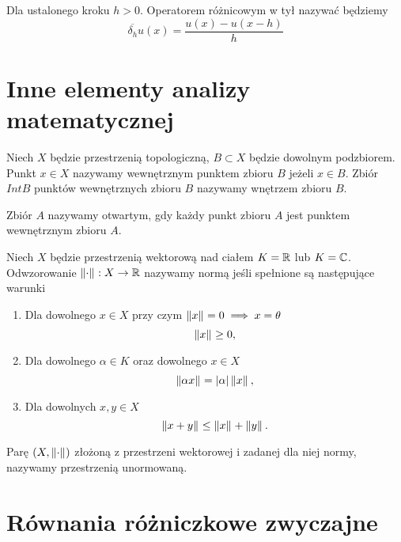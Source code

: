 \documentclass[12pt,a4paper]{report}
\begin{document}
\begin{definition}\label{operator_wtyl}
Dla ustalonego kroku $h>0$. Operatorem różnicowym w tył nazywać będziemy 
$$
\overline{\delta_h} u(x) = \frac{u(x)-u(x-h)}{h} 
$$
\end{definition}


\section{Inne elementy analizy matematycznej}

\begin{definition}
Niech $X$ będzie przestrzenią topologiczną, $B \subset X $ będzie dowolnym podzbiorem. Punkt $x \in X$ nazywamy wewnętrznym punktem zbioru $B$ jeżeli $x \in B$. Zbiór $IntB$ punktów wewnętrznych zbioru $B$ nazywamy wnętrzem zbioru $B$. 
\end{definition}
\begin{definition} 
Zbiór $A$ nazywamy otwartym, gdy każdy punkt zbioru $A$ jest punktem wewnętrznym zbioru $A$. 
\end{definition}

\begin{definition}
Niech $X$ będzie przestrzenią wektorową nad ciałem $K =\mathbb{R} $ lub $ K = \mathbb{C} $. Odwzorowanie $\left\| {\cdot} \right\|_{}: X \to \mathbb{R}$ nazywamy normą jeśli spełnione są następujące warunki 
\begin{enumerate}
\item Dla dowolnego $x\in X$ przy czym  $  \left\| {x} \right\|_{} = 0 \implies x = \theta$
$$
\left\| {x} \right\|_{} \geq 0 ,
$$
\item Dla dowolnego $\alpha \in K$ oraz dowolnego $x \in X$ 
$$
\left\| {\alpha x} \right\|_{}  = {\left| {\alpha} \right|}  \left\| {x} \right\|_{},
$$
\item Dla dowolnych $x,y\in X$
$$
 \left\| {x+y} \right\|_{} \leq \left\| {x} \right\|_{} + \left\| {y} \right\|_{}.
$$
\end{enumerate}
Parę $ (X, \left\| {\cdot} \right\|_{})$ złożoną z przestrzeni wektorowej i zadanej dla niej normy, nazywamy przestrzenią unormowaną. 
\end{definition}

\section{Równania różniczkowe zwyczajne}
\end{document}
